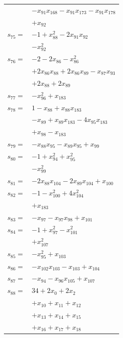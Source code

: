 \begin{longtable}{@{}r@{\;}l@{}}
 & \(\displaystyle -x_{91}x_{168} -x_{91}x_{173} -x_{91}x_{178}\) \\
 & \(\displaystyle +x_{92}\) \\[3pt]
\(s_{75}=\) & \(\displaystyle -1 +x_{88}^{2} -2x_{91}x_{92}\) \\
 & \(\displaystyle -x_{92}^{2}\) \\[3pt]
\(s_{76}=\) & \(\displaystyle -2 -2x_{86} -x_{86}^{2}\) \\
 & \(\displaystyle +2x_{86}x_{88} +2x_{86}x_{89} -x_{87}x_{93}\) \\
 & \(\displaystyle +2x_{88} +2x_{89}\) \\[3pt]
\(s_{77}=\) & \(\displaystyle -x_{96}^{2} +x_{183}\) \\[3pt]
\(s_{78}=\) & \(\displaystyle 1 -x_{88} +x_{88}x_{183}\) \\
 & \(\displaystyle -x_{89} +x_{89}x_{183} -4x_{95}x_{183}\) \\
 & \(\displaystyle +x_{98} -x_{183}\) \\[3pt]
\(s_{79}=\) & \(\displaystyle -x_{88}x_{95} -x_{89}x_{95} +x_{99}\) \\[3pt]
\(s_{80}=\) & \(\displaystyle -1 +x_{94}^{2} +x_{95}^{2}\) \\
 & \(\displaystyle -x_{99}^{2}\) \\[3pt]
\(s_{81}=\) & \(\displaystyle -2x_{88}x_{104} -2x_{89}x_{104} +x_{100}\) \\[3pt]
\(s_{82}=\) & \(\displaystyle -1 -x_{100}^{2} +4x_{104}^{2}\) \\
 & \(\displaystyle +x_{183}\) \\[3pt]
\(s_{83}=\) & \(\displaystyle -x_{97} -x_{97}x_{98} +x_{101}\) \\[3pt]
\(s_{84}=\) & \(\displaystyle -1 +x_{97}^{2} -x_{101}^{2}\) \\
 & \(\displaystyle +x_{107}^{2}\) \\[3pt]
\(s_{85}=\) & \(\displaystyle -x_{95}^{2} +x_{103}\) \\[3pt]
\(s_{86}=\) & \(\displaystyle -x_{102}x_{103} -x_{103} +x_{104}\) \\[3pt]
\(s_{87}=\) & \(\displaystyle -x_{94} -x_{96}x_{105} +x_{107}\) \\[3pt]
\(s_{88}=\) & \(\displaystyle 34 +2x_{0} +2x_{2}\) \\
 & \(\displaystyle +x_{10} +x_{11} +x_{12}\) \\
 & \(\displaystyle +x_{13} +x_{14} +x_{15}\) \\
 & \(\displaystyle +x_{16} +x_{17} +x_{18}\) \\

\end{longtable}
